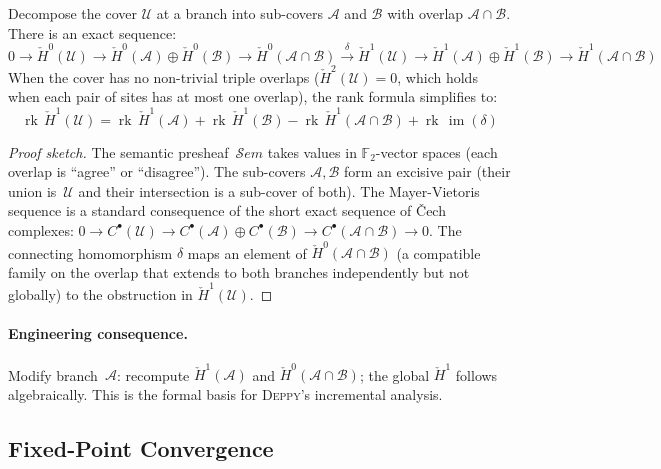 \documentclass[acmsmall,screen]{acmart}
\theoremstyle{remark}
\newcommand{\Sem}{\mathcal{S}\mathit{em}}
\newcommand{\Hc}[1]{\check{H}^{#1}}
\newcommand{\rk}{\operatorname{rk}}
\newcommand{\im}{\operatorname{im}}
\newcommand{\GF}{\mathbb{F}}
\begin{document}
\begin{theorem}\label{thm:mayer-vietoris}
Decompose the cover $\mathcal{U}$ at a branch into sub-covers
$\mathcal{A}$ and $\mathcal{B}$ with overlap
$\mathcal{A} \cap \mathcal{B}$.  There is an exact sequence:
\[
  0 \to \Hc{0}(\mathcal{U}) \to
  \Hc{0}(\mathcal{A}) \oplus \Hc{0}(\mathcal{B}) \to
  \Hc{0}(\mathcal{A} \cap \mathcal{B})
  \xrightarrow{\delta}
  \Hc{1}(\mathcal{U}) \to
  \Hc{1}(\mathcal{A}) \oplus \Hc{1}(\mathcal{B}) \to
  \Hc{1}(\mathcal{A} \cap \mathcal{B})
\]
When the cover has no non-trivial triple overlaps
($\Hc{2}(\mathcal{U}) = 0$, which holds when each pair of sites
has at most one overlap), the rank formula simplifies to:
\[
  \rk\,\Hc{1}(\mathcal{U}) = \rk\,\Hc{1}(\mathcal{A})
    + \rk\,\Hc{1}(\mathcal{B})
    - \rk\,\Hc{1}(\mathcal{A} \cap \mathcal{B})
    + \rk\,\im(\delta)
\]
\end{theorem}

\begin{proof}[Proof sketch]
The semantic presheaf~$\Sem$ takes values in $\GF_2$-vector spaces
(each overlap is ``agree'' or ``disagree'').  The sub-covers
$\mathcal{A}, \mathcal{B}$ form an excisive pair (their union
is~$\mathcal{U}$ and their intersection is a sub-cover of both).
The Mayer-Vietoris sequence is a standard consequence of the
short exact sequence of \v{C}ech complexes:
$0 \to C^\bullet(\mathcal{U}) \to C^\bullet(\mathcal{A}) \oplus
C^\bullet(\mathcal{B}) \to C^\bullet(\mathcal{A} \cap \mathcal{B})
\to 0$.
The connecting homomorphism $\delta$ maps an element of
$\Hc{0}(\mathcal{A} \cap \mathcal{B})$ (a compatible family on the
overlap that extends to both branches independently but not globally)
to the obstruction in $\Hc{1}(\mathcal{U})$.
\end{proof}

\paragraph{Engineering consequence.}
Modify branch~$\mathcal{A}$: recompute $\Hc{1}(\mathcal{A})$
and $\Hc{0}(\mathcal{A} \cap \mathcal{B})$; the global $\Hc{1}$
follows algebraically.  This is the formal basis for
\textsc{Deppy}'s incremental analysis.

\subsection{Fixed-Point Convergence}\label{sec:convergence}
\end{document}
